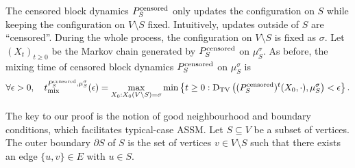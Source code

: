 \documentclass[11pt]{amsart}
\def\-#1{\mathrm{#1}}
\newcommand{\DTV}[2]{\-D_{\mathrm{TV}}\left({#1},{#2}\right)}
\theoremstyle{definition}
\theoremstyle{remark}
\begin{document}
    The censored block dynamics $P_S^{\textnormal{censored}}$ only updates the configuration on $S$ while keeping the configuration on $V \setminus S$ fixed.
    Intuitively, updates outside of $S$ are ``censored''.
    During the whole process, the configuration on $V \setminus S$ is fixed as $\sigma$.
    Let $(X_t)_{t \geq 0}$ be the Markov chain generated by $P_S^{\textnormal{censored}}$ on $\mu_S^\sigma$. 
    As before, the mixing time of censored block dynamics $P_S^{\textnormal{censored}}$ on $\mu_S^\sigma$ is
    \begin{align*}
      \forall \epsilon>0, \quad t^{P_S^{\textnormal{censored}},\mu_S^\sigma}_{\textnormal{mix}}(\epsilon) =\max_{X_0:X_0(V \setminus S) = \sigma}\min\left\{t \geq 0: \DTV{(P_S^{\textnormal{censored}})^t(X_0,\cdot)}{\mu_S^\sigma} < \epsilon\right\}.
    \end{align*}

    The key to our proof is the notion of good neighbourhood and boundary conditions, which facilitates typical-case ASSM.
Let $S \subseteq V$ be a subset of vertices. 
The outer boundary $\partial S$ of $S$ is the set of vertices $v \in V \setminus S$ such that there exists an edge $\{u,v\} \in E$ with $u \in S$.
\end{document}
